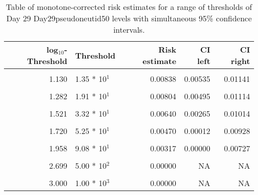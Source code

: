 \documentclass[]{article}
\begin{document}
\begin{table}[!h]

\caption{\label{tab:unnamed-chunk-77}Table of monotone-corrected risk estimates for a range of thresholds of Day 29 Day29pseudoneutid50 levels with simultaneous 95\% confidence intervals.}
\centering
\begin{tabular}[t]{rlrrr}
\toprule
log$_{10}$-Threshold & Threshold & Risk estimate & CI left & CI right\\
\midrule
\cellcolor{gray!6}{0.083} & \cellcolor{gray!6}{1.21 * 10$^{0}$} & \cellcolor{gray!6}{0.00875} & \cellcolor{gray!6}{0.00588} & \cellcolor{gray!6}{0.01162}\\
1.130 & 1.35 * 10$^{1}$ & 0.00838 & 0.00535 & 0.01141\\
\cellcolor{gray!6}{1.204} & \cellcolor{gray!6}{1.60 * 10$^{1}$} & \cellcolor{gray!6}{0.00838} & \cellcolor{gray!6}{0.00531} & \cellcolor{gray!6}{0.01145}\\
1.282 & 1.91 * 10$^{1}$ & 0.00804 & 0.00495 & 0.01114\\
\cellcolor{gray!6}{1.423} & \cellcolor{gray!6}{2.65 * 10$^{1}$} & \cellcolor{gray!6}{0.00678} & \cellcolor{gray!6}{0.00368} & \cellcolor{gray!6}{0.00989}\\
1.521 & 3.32 * 10$^{1}$ & 0.00640 & 0.00265 & 0.01014\\
\cellcolor{gray!6}{1.613} & \cellcolor{gray!6}{4.10 * 10$^{1}$} & \cellcolor{gray!6}{0.00579} & \cellcolor{gray!6}{0.00150} & \cellcolor{gray!6}{0.01008}\\
1.720 & 5.25 * 10$^{1}$ & 0.00470 & 0.00012 & 0.00928\\
\cellcolor{gray!6}{1.891} & \cellcolor{gray!6}{7.78 * 10$^{1}$} & \cellcolor{gray!6}{0.00403} & \cellcolor{gray!6}{0.00000} & \cellcolor{gray!6}{0.00915}\\
1.958 & 9.08 * 10$^{1}$ & 0.00317 & 0.00000 & 0.00727\\
\cellcolor{gray!6}{2.047} & \cellcolor{gray!6}{1.11 * 10$^{2}$} & \cellcolor{gray!6}{0.00287} & \cellcolor{gray!6}{0.00000} & \cellcolor{gray!6}{0.00607}\\
2.699 & 5.00 * 10$^{2}$ & 0.00000 & NA & NA\\
\cellcolor{gray!6}{2.828} & \cellcolor{gray!6}{6.73 * 10$^{2}$} & \cellcolor{gray!6}{0.00000} & \cellcolor{gray!6}{NA} & \cellcolor{gray!6}{NA}\\
3.000 & 1.00 * 10$^{3}$ & 0.00000 & NA & NA\\
\bottomrule
\end{tabular}
\end{table}
\end{document}
